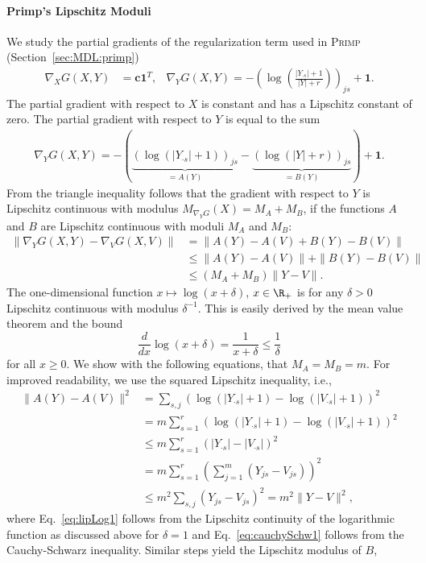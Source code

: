 \paragraph{Primp's Lipschitz Moduli}
We study the partial gradients of the regularization term used in \textsc{Primp} (Section~\ref{sec:MDL:primp})
\begin{align*}
\nabla_X G(X,Y)&=\mathbf{c1}^T,&
\nabla_Y G(X,Y)=-\left(\log\left(\frac{|Y_{\cdot s}|+1}{|Y|+r}\right)\right)_{js}+\mathbf{1}.
\end{align*}
The partial gradient with respect to $X$ is constant and has a Lipschitz constant of zero. The partial gradient with respect to $Y$ is equal to the sum
\begin{align*}
\nabla_YG(X,Y)=-(\underbrace{(\log(|Y_{\cdot s}|+1))_{js}}_{=A(Y)}-\underbrace{(\log(|Y|+r))_{js}}_{=B(Y)})+\mathbf{1}.
\end{align*}
From the triangle inequality follows that the gradient with respect to $Y$ is Lipschitz continuous with modulus $M_{\nabla_YG}(X)=M_A+M_B$, if the functions $A$ and $B$ are Lipschitz continuous with moduli $M_A$ and $M_B$:
\begin{align*}
\|\nabla_YG(X,Y)-\nabla_VG(X,V)\|&=\|A(Y)-A(V)+B(Y)-B(V)\|\\
&\leq \|A(Y)-A(V)\|+\|B(Y)-B(V)\|\\
&\leq (M_A+M_B)\|Y-V\|.
\end{align*}
The one-dimensional function $x\mapsto\log(x+\delta)$, $x\in \R_+$ is for any $\delta>0$ Lipschitz continuous with modulus $\delta^{-1}$. This is easily derived by the mean value theorem and the bound 
\[\frac{d}{dx}\log(x+\delta)=\frac{1}{x+\delta}\leq \frac{1}{\delta}\]
for all $x\geq 0$. We show with the following equations, that $M_A=M_B=m$. For improved readability, we use the squared Lipschitz inequality, i.e.,
\begin{align}
\|A(Y)-A(V)\|^2 &=\sum_{s,j}(\log(|Y_{\cdot s}|+1)-\log(|V_{\cdot s}|+1))^2\nonumber\\
&=m\sum_{s=1}^r(\log(|Y_{\cdot s}|+1)-\log(|V_{\cdot s}|+1))^2\nonumber \\
&\leq m\sum_{s=1}^r(|Y_{\cdot s}|-|V_{\cdot s}|)^2\label{eq:lipLog1}\\
&= m\sum_{s=1}^r\left(\sum_{j=1}^m(Y_{j s}-V_{j s})\right)^2\nonumber\\
&\leq m^2\sum_{s,j}(Y_{j s}-V_{j s})^2= m^2\|Y-V\|^2,\label{eq:cauchySchw1}
\end{align}
where Eq.~\eqref{eq:lipLog1} follows from the Lipschitz continuity of the logarithmic function as discussed above for $\delta=1$ and Eq.~\eqref{eq:cauchySchw1} follows from the Cauchy-Schwarz inequality. Similar steps yield the Lipschitz modulus of $B$,

